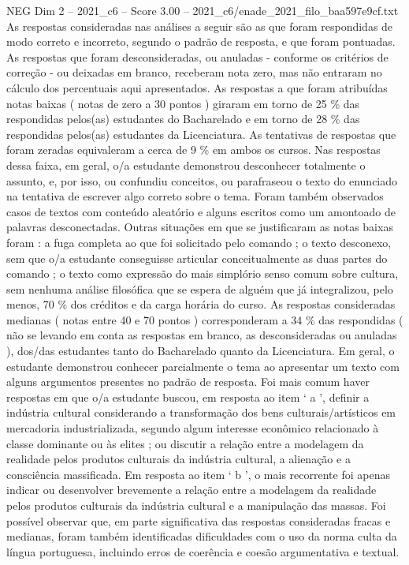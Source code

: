 \begin{textsample}{NEG Dim 2 – 2021\_c6 – Score 3.00 – 2021\_c6/enade\_2021\_filo\_baa597e9cf.txt}
As respostas consideradas nas análises a seguir são as que foram respondidas de modo correto e incorreto, segundo o padrão de resposta, e que foram pontuadas.
As respostas que foram desconsideradas, ou anuladas - conforme os critérios de correção - ou deixadas em branco, receberam nota zero, mas não entraram no cálculo dos percentuais aqui apresentados.
As respostas a que foram atribuídas notas baixas ( notas de zero a 30 pontos ) giraram em torno de 25 \% das respondidas pelos(as) estudantes do Bacharelado e em torno de 28 \% das respondidas pelos(as) estudantes da Licenciatura.
As tentativas de respostas que foram zeradas equivaleram a cerca de 9 \% em ambos os cursos.
Nas respostas dessa faixa, em geral, o/a estudante demonstrou desconhecer totalmente o assunto, e, por isso, ou confundiu conceitos, ou parafraseou o texto do enunciado na tentativa de escrever algo correto sobre o tema.
Foram também observados casos de textos com conteúdo aleatório e alguns escritos como um amontoado de palavras desconectadas.
Outras situações em que se justificaram as notas baixas foram : a fuga completa ao que foi solicitado pelo comando ; o texto desconexo, sem que o/a estudante conseguisse articular conceitualmente as duas partes do comando ; o texto como expressão do mais simplório senso comum sobre cultura, sem nenhuma análise filosófica que se espera de alguém que já integralizou, pelo menos, 70 \% dos créditos e da carga horária do curso.
As respostas consideradas medianas ( notas entre 40 e 70 pontos ) corresponderam a 34 \% das respondidas ( não se levando em conta as respostas em branco, as desconsideradas ou anuladas ), dos/das estudantes tanto do Bacharelado quanto da Licenciatura.
Em geral, o estudante demonstrou conhecer parcialmente o tema ao apresentar um texto com alguns argumentos presentes no padrão de resposta.
Foi mais comum haver respostas em que o/a estudante buscou, em resposta ao item ‘ a ’, definir a indústria cultural considerando a transformação dos bens culturais/artísticos em mercadoria industrializada, segundo algum interesse econômico relacionado à classe dominante ou às elites ; ou discutir a relação entre a modelagem da realidade pelos produtos culturais da indústria cultural, a alienação e a consciência massificada.
Em resposta ao item ‘ b ’, o mais recorrente foi apenas indicar ou desenvolver brevemente a relação entre a modelagem da realidade pelos produtos culturais da indústria cultural e a manipulação das massas.
Foi possível observar que, em parte significativa das respostas consideradas fracas e medianas, foram também identificadas dificuldades com o uso da norma culta da língua portuguesa, incluindo erros de coerência e coesão argumentativa e textual.

\end{textsample}
